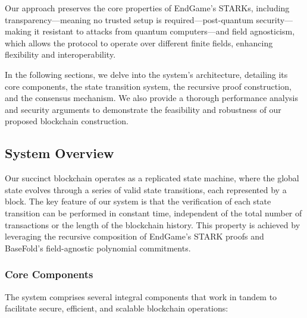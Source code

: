 \documentclass{article}
\theoremstyle{plain}
\theoremstyle{definition}
\theoremstyle{remark}
\theoremstyle{problem}
\begin{document}
Our approach preserves the core properties of EndGame's STARKs, including transparency---meaning no trusted setup is required---post-quantum security---making it resistant to attacks from quantum computers---and field agnosticism, which allows the protocol to operate over different finite fields, enhancing flexibility and interoperability.

In the following sections, we delve into the system's architecture, detailing its core components, the state transition system, the recursive proof construction, and the consensus mechanism. We also provide a thorough performance analysis and security arguments to demonstrate the feasibility and robustness of our proposed blockchain construction.

\subsection{System Overview}

Our succinct blockchain operates as a replicated state machine, where the global state evolves through a series of valid state transitions, each represented by a block. The key feature of our system is that the verification of each state transition can be performed in constant time, independent of the total number of transactions or the length of the blockchain history. This property is achieved by leveraging the recursive composition of EndGame's STARK proofs and BaseFold's field-agnostic polynomial commitments.

\subsubsection{Core Components}

The system comprises several integral components that work in tandem to facilitate secure, efficient, and scalable blockchain operations:
\end{document}
